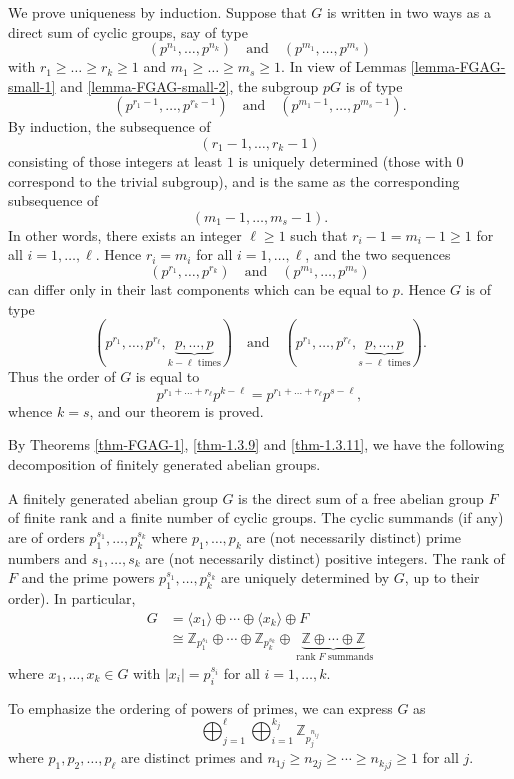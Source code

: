 \begin{sketch}
	We prove uniqueness by induction. Suppose that $G$ is written in two ways as a direct sum of cyclic groups, say of type
	$$ (p^{n_1}, \dots, p^{n_k}) \quad \text{and} \quad (p^{m_1}, \dots, p^{m_s}) $$
	with $r_1 \ge \dots \ge r_k \ge 1$ and $m_1 \ge \dots \ge m_s \ge 1$. In view of Lemmas \ref{lemma-FGAG-small-1} and \ref{lemma-FGAG-small-2}, the subgroup $pG$  is of type
	$$ (p^{r_1-1}, \dots, p^{r_k-1}) \quad \text{and} \quad (p^{m_1-1}, \dots, p^{m_s-1}). $$
By induction, the subsequence of
	$$ (r_1-1, \dots, r_k-1) $$
	consisting of those integers at least $1$ is uniquely determined (those with $0$ correspond to the trivial subgroup), and is the same as the corresponding subsequence of
	$$ (m_1-1, \dots, m_s-1). $$
	In other words, there exists an integer $\ell \geq 1$ such that $r_i-1 = m_i-1\geq 1$ for all $i=1,\dots, \ell$. Hence $r_i = m_i$ for all $i=1,\dots, \ell$, and the two sequences
	$$ (p^{r_1}, \dots, p^{r_k}) \quad \text{and} \quad (p^{m_1}, \dots, p^{m_s}) $$
	can differ only in their last components which can be equal to $p$. Hence $G$ is of type
	$$ (p^{r_1}, \dots, p^{r_\ell}, \underbrace{p, \dots, p}_{k-\ell \text{ times}}) \quad \text{and} \quad (p^{r_1}, \dots, p^{r_\ell}, \underbrace{p, \dots, p}_{s-\ell \text{ times}}). $$
	Thus the order of $G$ is equal to
	$$ p^{r_1 + \dots + r_\ell} p^{k-\ell} = p^{r_1 + \dots + r_\ell} p^{s-\ell}, $$
	whence $k = s$, and our theorem is proved.
\end{sketch}

By Theorems \ref{thm-FGAG-1}, \ref{thm-1.3.9} and \ref{thm-1.3.11}, we have the following decomposition of finitely generated abelian groups.
\begin{theorem} \label{thm-decomposition-of-AG-elem-div}
	A finitely generated abelian group $G$ is the direct sum of a free abelian group $F$ of finite rank and a finite number of
	cyclic groups. The cyclic summands (if any) are of orders $p_1^{s_1},\dots, p_k^{s_k}$ 
	where $p_1, \dots , p_k$ are (not necessarily distinct) prime numbers and $s_1, \dots , s_k$ are (not
	necessarily distinct) positive integers. The rank of $F$ and the prime powers $p_1^{s_1},\dots, p_k^{s_k}$ are uniquely determined by $G$, up to their order). In particular,
	\begin{align*}
		G&= \langle x_1 \rangle\oplus \cdots \oplus \langle x_k \rangle\oplus F\\
		&\cong \mathbb{Z}_{p_1^{s_1}}\oplus \cdots \oplus \mathbb{Z}_{p_k^{s_k}}\oplus \underbrace{\mathbb{Z} \oplus \cdots \oplus \mathbb{Z}}_{\operatorname{rank} F \text{ summands}}
	\end{align*}
	where $x_1,\dots, x_k\in G$ with $|x_i| = p_i^{s_i}$ for all $i=1,\dots, k$.
\end{theorem}
\begin{remark}
	To emphasize the ordering of powers of primes, we can express $G$ as
	\begin{equation*}
		\bigoplus_{j=1}^\ell \bigoplus_{i=1}^{k_{j}} \mathbb{Z}_{p_j^{n_{ij}}}
	\end{equation*}
	where $p_1,p_2,\dots, p_\ell$ are distinct primes and $n_{1j}\geq n_{2j}\geq \cdots \geq n_{k_j j}\geq 1$ for all $j$.
\end{remark}


